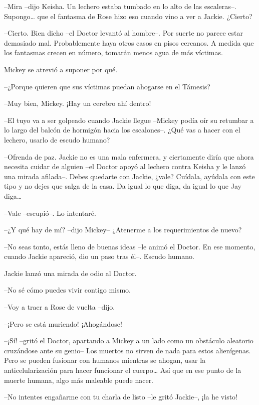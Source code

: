 {--Mira --dijo Keisha. Un lechero estaba tumbado en lo alto de las
 escaleras--. Supongo\ldots{} que el fantasma de Rose hizo eso cuando
vino a ver a Jackie. ¿Cierto?}

{--Cierto. Bien dicho --el Doctor levantó al hombre--. Por suerte no
 parece estar demasiado mal. Probablemente haya otros casos en pisos
 cercanos. A medida que los fantasmas crecen en número, tomarán menos
agua de más víctimas.}

{Mickey se atrevió a suponer por qué.}

{--¿Porque quieren que sus víctimas puedan ahogarse en el Támesis?}

{--Muy bien, Mickey. ¡Hay un cerebro ahí dentro!}

{--El tuyo va a ser golpeado cuando Jackie llegue --Mickey podía oír su
 retumbar a lo largo del balcón de hormigón hacia los escalones--. ¿Qué
vas a hacer con el lechero, usarlo de escudo humano?}

{--Ofrenda de paz. Jackie no es una mala enfermera, y ciertamente diría
 que ahora necesita cuidar de alguien --el Doctor apoyó al lechero contra
 Keisha y le lanzó una mirada afilada--. Debes quedarte con Jackie,
 ¿vale? Cuídala, ayúdala con este tipo y no dejes que salga de la casa.
 Da igual lo que diga, da igual lo que Jay diga\ldots{}}

{--Vale --escupió--. Lo intentaré.}

{--¿Y qué hay de mí? --dijo Mickey-- ¿Atenerme a los requerimientos de
nuevo?}

{--No seas tonto, estás lleno de buenas ideas --le animó el Doctor. En
 ese momento, cuando Jackie apareció, dio un paso tras él--. Escudo
humano.}

{Jackie lanzó una mirada de odio al Doctor.}

{--No sé cómo puedes vivir contigo mismo.}

{--Voy a traer a Rose de vuelta --dijo.}

{--¡Pero se está muriendo! ¡Ahogándose!}

{--¡Sí! --gritó el Doctor, apartando a Mickey a un lado como un
 obstáculo aleatorio cruzándose ante su genio-- Los muertos no sirven de
 nada para estos alienígenas. Pero se pueden fusionar con humanos
 mientras se ahogan, usar la anticelularización para hacer funcionar el
 cuerpo\ldots{} Así que en ese punto de la muerte humana, algo más
maleable puede nacer.}

{--No intentes engañarme con tu charla de listo --le gritó Jackie--, ¡la
he visto!}


